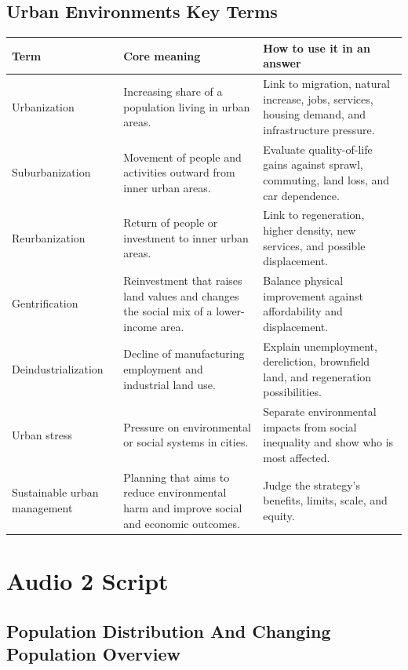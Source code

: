 \documentclass[11pt,a4paper]{article}
\begin{document}
\subsection{Urban Environments Key Terms}

\begin{tabularx}{\textwidth}{L{0.24\textwidth}Y Y}
\toprule
\textbf{Term} & \textbf{Core meaning} & \textbf{How to use it in an answer} \\
\midrule
Urbanization & Increasing share of a population living in urban areas. &
Link to migration, natural increase, jobs, services, housing demand, and
infrastructure pressure. \\
Suburbanization & Movement of people and activities outward from inner urban
areas. & Evaluate quality-of-life gains against sprawl, commuting, land loss,
and car dependence. \\
Reurbanization & Return of people or investment to inner urban areas. & Link to
regeneration, higher density, new services, and possible displacement. \\
Gentrification & Reinvestment that raises land values and changes the social mix
of a lower-income area. & Balance physical improvement against affordability and
displacement. \\
Deindustrialization & Decline of manufacturing employment and industrial land
use. & Explain unemployment, dereliction, brownfield land, and regeneration
possibilities. \\
Urban stress & Pressure on environmental or social systems in cities. & Separate
environmental impacts from social inequality and show who is most affected. \\
Sustainable urban management & Planning that aims to reduce environmental harm
and improve social and economic outcomes. & Judge the strategy's benefits,
limits, scale, and equity. \\
\bottomrule
\end{tabularx}

\newpage

\section{Audio 2 Script}
\subsection{Population Distribution And Changing Population Overview}
\end{document}
